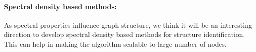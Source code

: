 \paragraph{Spectral density based methods:} As spectral properties influence graph structure, we think it will be an interesting direction to develop spectral density based methods for structure identification. This can help in making the algorithm scalable to large number of nodes. 
